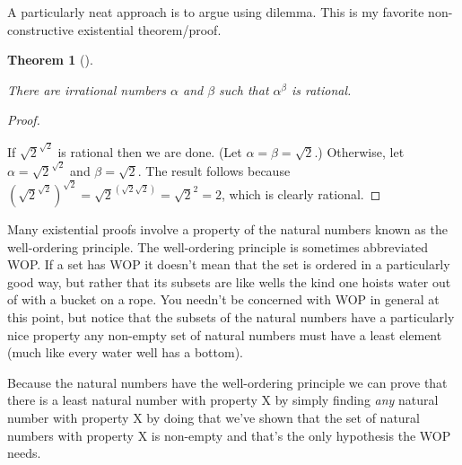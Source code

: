 \documentclass[10pt,]{book}
\theoremstyle{plain}
\newtheorem{theorem}{Theorem}[section]
\theoremstyle{definition}
\theoremstyle{definition}
\numberwithin{equation}{section}
\begin{document}
    A particularly neat approach is to argue using dilemma.
    This is my favorite non-constructive existential theorem/proof.
\begin{theorem}[{}]\label{theorem-12}

        There are irrational numbers \(\alpha\) and \(\beta\) such that \(\alpha^\beta\)
        is rational.
\end{theorem}
\begin{proof}\hypertarget{proof-19}{}

      If \(\sqrt{2}^{\sqrt{2}}\) is rational then we are done.
      (Let \(\alpha = \beta = \sqrt{2}\).) Otherwise, let
      \(\alpha = \sqrt{2}^{\sqrt{2}}\) and \(\beta = \sqrt{2}\). The result
      follows because \(\left(\sqrt{2}^{\sqrt{2}}\right)^{\sqrt{2}} = \sqrt{2}^{(\sqrt{2}\sqrt{2})} 
      = \sqrt{2}^2 = 2\), which is clearly rational.
\end{proof}
\par

    Many existential proofs involve a property of the natural numbers
    known as the well-ordering principle. The well-ordering principle is
    sometimes abbreviated WOP. If a set has WOP it doesn't mean that the
    set is ordered in a particularly good way, but rather that its subsets
    are like wells \textemdash{} the kind one hoists water out of with a bucket on a rope.
    You needn't be concerned with WOP in general at this point, but notice
    that the subsets of the natural numbers have a particularly nice property \textemdash{} any non-empty set of natural numbers must have a least element (much like
    every water well has a bottom).
\par

    Because the natural numbers have the well-ordering principle
    we can prove that there is a least
    natural number with property X by simply finding \emph{any} natural
    number with property X \textemdash{} by doing that we've shown that the set of
    natural numbers with property X is non-empty and that's the only
    hypothesis the WOP needs.
\par
\end{document}
